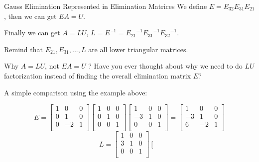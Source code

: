 \documentclass{beamer}
\begin{document}
\begin{frame}{Gauss Elimination Represented in Elimination Matrices}
We define $E=E_{32}E_{31}E_{21}$, then we can get $EA=U$.

\vspace{3pt}
Finally we can get $A=LU$, $L=E^{-1}={E_{21}}^{-1}{E_{31}}^{-1}{E_{32}}^{-1}$.

\vspace{3pt}
Remind that $E_{21},E_{31},...,L$ are all lower triangular matrices.
\end{frame}

\begin{frame}{Why $A=LU$, not $EA=U$ ?}
Have you ever thought about why we need to do $LU$ factorization instead of finding the overall elimination matrix $E$?

A simple comparison using the example above:

\begin{equation*}
    E=\left[ \begin{matrix}
        1&		0&		0\\
        0&		1&		0\\
        0&		-2&		1\\
    \end{matrix} \right] \left[ \begin{matrix}
        1&		0&		0\\
        0&		1&		0\\
        0&		0&		1\\
    \end{matrix} \right] \left[ \begin{matrix}
        1&		0&		0\\
        -3&		1&		0\\
        0&		0&		1\\
    \end{matrix} \right] =\left[ \begin{matrix}
        1&		0&		0\\
        -3&		1&		0\\
        6&		-2&		1\\
    \end{matrix} \right]
\end{equation*}
\begin{equation*}
    L=\left[ \begin{matrix}
        1&		0&		0\\
        3&		1&		0\\
        0&		0&		1\\
    \end{matrix} \right] \left[ \begin{matrix}

\end{matrix}
\end{equation*}
\end{frame}
\end{document}
